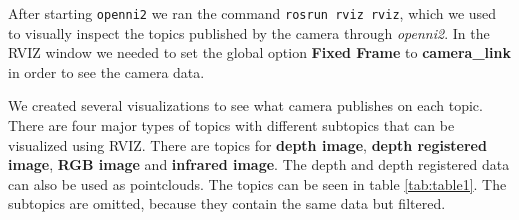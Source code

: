 \documentclass[11pt]{article}
\begin{document}
After starting \texttt{openni2} we ran the command \texttt{rosrun rviz rviz},
which we used to visually inspect the topics published by the camera through \emph{openni2}. In the
RVIZ window we needed to set the global option \textbf{Fixed Frame} to
\textbf{camera\_link} in order to see the camera data. \par

We created several visualizations to see what camera publishes on each
topic. There are four major types of topics with different subtopics that can be
visualized using RVIZ. There are topics for \textbf{depth image}, \textbf{depth
  registered image}, \textbf{RGB image} and \textbf{infrared image}. The
depth and depth registered data can also be used as pointclouds. The topics can be
seen in table \vref{tab:table1}. The subtopics are omitted, because they contain
the same data but filtered. \par
\noindent
\end{document}
